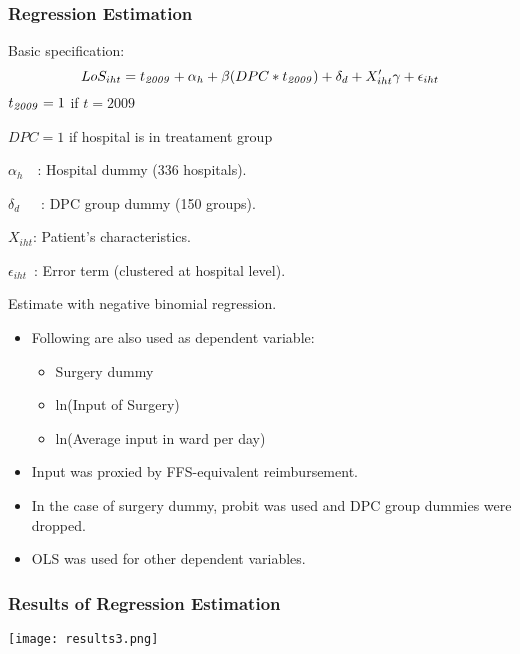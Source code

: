 \documentclass[14pt]{beamer}
\begin{document}
\begin{frame}[allowframebreaks]
\frametitle{Regression Estimation}
Basic specification:
\begin{equation}
LoS_{iht} = t_{\it 2009} + \alpha_{h} + \beta(DPC*t_{\it 2009}) + \delta_{d} + X'_{iht}\gamma + \epsilon_{iht}
\end{equation}
$t_{\it 2009}=1$ if $t=2009$\par
$DPC=1$ if hospital is in treatament group\par
$\alpha_{h}$\ \ : Hospital dummy (336 hospitals).\par
$\delta_{d}$\ \ \ : DPC group dummy (150 groups).\par
$X_{iht}$: Patient's characteristics.\par
$\epsilon_{iht}$\  : Error term (clustered at hospital level).\par
\vspace{\baselineskip}
Estimate with negative binomial regression.

\framebreak

\begin{itemize}
\item Following are also used as dependent variable:
  \begin{itemize}
  \item Surgery dummy
  \item ln(Input of Surgery)
  \item ln(Average input in ward per day)
  \end{itemize}
\item Input was proxied by FFS-equivalent reimbursement.
\item In the case of surgery dummy, probit was used and DPC group dummies were dropped.
\item OLS was used for other dependent variables.
\end{itemize}

\end{frame}

\begin{frame}%
\frametitle{Results of Regression Estimation}

\begin{center}
\texttt{[image: results3.png]}
\end{center}

\end{frame}
\end{document}
